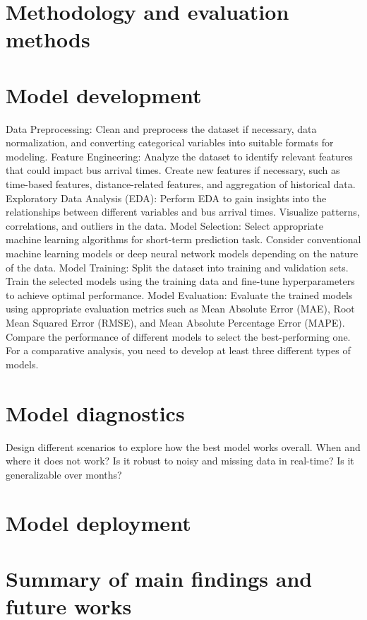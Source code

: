 	\section{Methodology and evaluation methods}
	
	
	\section{Model development}
	
	Data Preprocessing: Clean and preprocess the dataset if necessary, data normalization, and converting categorical variables into suitable formats for modeling.
	Feature Engineering: Analyze the dataset to identify relevant features that could impact bus arrival times. Create new features if necessary, such as time-based features, distance-related features, and aggregation of historical data.
	Exploratory Data Analysis (EDA): Perform EDA to gain insights into the relationships between different variables and bus arrival times. Visualize patterns, correlations, and outliers in the data.
	Model Selection: Select appropriate machine learning algorithms for short-term prediction task. Consider conventional machine learning models or deep neural network models depending on the nature of the data. 
	Model Training: Split the dataset into training and validation sets. Train the selected models using the training data and fine-tune hyperparameters to achieve optimal performance.
	Model Evaluation: Evaluate the trained models using appropriate evaluation metrics such as Mean Absolute Error (MAE), Root Mean Squared Error (RMSE), and Mean Absolute Percentage Error (MAPE). Compare the performance of different models to select the best-performing one. For a comparative analysis, you need to develop at least three different types of models. 
	\section{Model diagnostics}
	
	Design different scenarios to explore how the best model works overall. When and where it does not work? Is it robust to noisy and missing data in real-time? Is it generalizable over months?  
	
	\section{Model deployment}  
	
	
	
	
	\section{Summary of main findings and future works}
	
